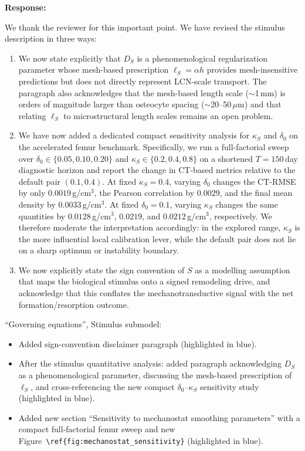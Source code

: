 \documentclass[11pt,a4paper]{article}
\newcounter{reviewer}
\newcommand{\response}{%
  \par\noindent\textbf{Response:}\par\noindent\color{responseblack}%
}
\newcommand{\change}{%
  \par\noindent{\color{blue}\textbf{Change in manuscript:}}\par\noindent\color{blue}%
}
\begin{document}
\response
We thank the reviewer for this important point. We have revised the stimulus description in three ways:

\begin{enumerate}[nosep]
\item We now state explicitly that $D_S$ is a phenomenological regularization parameter whose mesh-based prescription $\ell_S=\alpha h$ provides mesh-insensitive predictions but does not directly represent LCN-scale transport. The paragraph also acknowledges that the mesh-based length scale ($\sim$1\,mm) is orders of magnitude larger than osteocyte spacing ($\sim$20--50\,$\mu$m) and that relating $\ell_S$ to microstructural length scales remains an open problem.
\item We have now added a dedicated compact sensitivity analysis for $\kappa_S$ and $\delta_0$ on the accelerated femur benchmark. Specifically, we run a full-factorial sweep over $\delta_0\in\{0.05,0.10,0.20\}$ and $\kappa_S\in\{0.2,0.4,0.8\}$ on a shortened $T=150$\,day diagnostic horizon and report the change in CT-based metrics relative to the default pair $(0.1,0.4)$. At fixed $\kappa_S=0.4$, varying $\delta_0$ changes the CT-RMSE by only $0.0019$\,g/cm$^3$, the Pearson correlation by $0.0029$, and the final mean density by $0.0033$\,g/cm$^3$. At fixed $\delta_0=0.1$, varying $\kappa_S$ changes the same quantities by $0.0128$\,g/cm$^3$, $0.0219$, and $0.0212$\,g/cm$^3$, respectively. We therefore moderate the interpretation accordingly: in the explored range, $\kappa_S$ is the more influential local calibration lever, while the default pair does not lie on a sharp optimum or instability boundary.
\item We now explicitly state the sign convention of $S$ as a modelling assumption that maps the biological stimulus onto a signed remodeling drive, and acknowledge that this conflates the mechanotransductive signal with the net formation/resorption outcome.
\end{enumerate}

\change
``Governing equations'', Stimulus submodel:
\begin{itemize}[nosep]
\item Added sign-convention disclaimer paragraph (highlighted in blue).
\item After the stimulus quantitative analysis: added paragraph acknowledging $D_S$ as a phenomenological parameter, discussing the mesh-based prescription of $\ell_S$, and cross-referencing the new compact $\delta_0$--$\kappa_S$ sensitivity study (highlighted in blue).
\item Added new section ``Sensitivity to mechanostat smoothing parameters'' with a compact full-factorial femur sweep and new Figure~\verb|\ref{fig:mechanostat_sensitivity}| (highlighted in blue).
\end{itemize}
\end{document}
